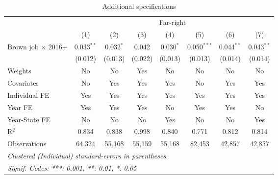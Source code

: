 
\begin{table}[htbp]
   \caption{Additional specifications}
   \centering
   \begin{tabular}{lccccccc}
      \tabularnewline \midrule \midrule
       & \multicolumn{7}{c}{Far-right}\\
                                & (1)          & (2)         & (3)     & (4)         & (5)           & (6)          & (7)\\  
      Brown job $\times$ 2016+  & 0.033$^{**}$ & 0.032$^{*}$ & 0.042   & 0.030$^{*}$ & 0.050$^{***}$ & 0.044$^{**}$ & 0.043$^{**}$\\   
                                & (0.012)      & (0.013)     & (0.022) & (0.013)     & (0.013)       & (0.014)      & (0.014)\\   
      Weights                   & No           & No          & Yes     & No          & No            & No           & No\\  
      Covariates                & No           & Yes         & Yes     & Yes         & No            & Yes          & Yes\\  
      Individual FE             & Yes          & Yes         & Yes     & Yes         & Yes           & Yes          & Yes\\  
      Year FE                   & Yes          & Yes         & Yes     & No          & Yes           & Yes          & No\\  
      Year-State FE             & No           & No          & No      & Yes         & No            & No           & Yes\\  
      R$^2$                     & 0.834        & 0.838       & 0.998   & 0.840       & 0.771         & 0.812        & 0.814\\  
      Observations              & 64,324       & 55,168      & 55,159  & 55,168      & 82,453        & 42,857       & 42,857\\  
      \midrule \midrule
      \multicolumn{8}{l}{\emph{Clustered (Individual) standard-errors in parentheses}}\\
      \multicolumn{8}{l}{\emph{Signif. Codes: ***: 0.001, **: 0.01, *: 0.05}}\\
   \end{tabular}
\end{table}



